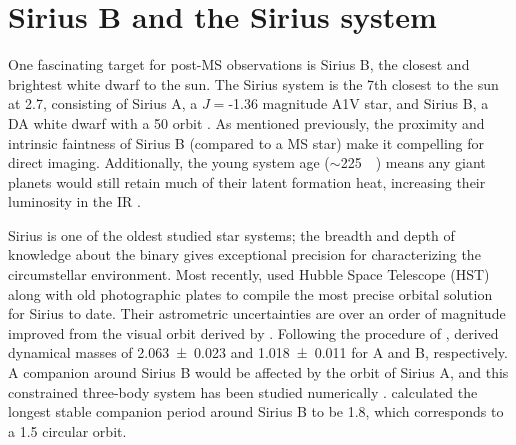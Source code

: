 \documentclass[twocolumn,linenumbers]{aastex631}
\begin{document}
\pagebreak

\section{Sirius B and the Sirius system}\label{sec:sirius}

One fascinating target for post-MS observations is Sirius B, the closest and brightest white dwarf to the sun. The Sirius system is the 7th closest to the sun at \qty{2.7}{\parsec}, consisting of Sirius A, a $J=$-1.36 magnitude A1V star, and Sirius B, a DA white dwarf with a \qty{50}{\year} orbit \citep{gaiacollaborationGaiaMission2016,bondSiriusSystemIts2017,gaiacollaborationGaiaEarlyData2021}. As mentioned previously, the proximity and intrinsic faintness of Sirius B (compared to a MS star) make it compelling for direct imaging. Additionally, the young system age ($\sim$\qty{225}{\mega\year}) means any giant planets would still retain much of their latent formation heat, increasing their luminosity in the IR \citep{fortneyGiantPlanetInterior2010}.

Sirius is one of the oldest studied star systems; the breadth and depth of knowledge about the binary gives exceptional precision for characterizing the circumstellar environment. Most recently, \citet{bondSiriusSystemIts2017} used Hubble Space Telescope (HST) along with old photographic plates to compile the most precise orbital solution for Sirius to date. Their astrometric uncertainties are over an order of magnitude improved from the visual orbit derived by \citet{vandenbosOrbitSiriusADS1960}. Following the procedure of \citet{gatewoodStudySirius1978}, \citet{bondSiriusSystemIts2017} derived dynamical masses of \qty{2.063+-0.023}{\solarmass} and \qty{1.018+-0.011}{\solarmass} for A and B, respectively. A companion around Sirius B would be affected by the orbit of Sirius A, and this constrained three-body system has been studied numerically \citep{holmanLongTermStabilityPlanets1999}. \citet{bondSiriusSystemIts2017} calculated the longest stable companion period around Sirius B to be \qty{1.8}{\year}, which corresponds to a \qty{1.5}{\au} circular orbit.
\end{document}
